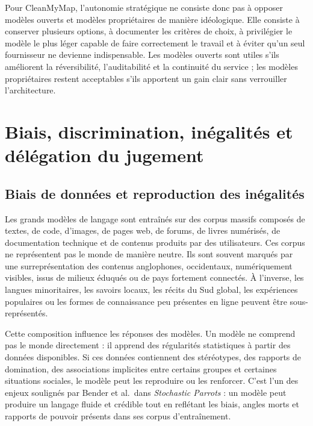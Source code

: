 \documentclass[
  10pt,
  a4paper,
  DIV=11,
  numbers=noendperiod,
  oneside]{scrreprt}
\let\oldemph\emph
\renewcommand{\emph}[1]{\oldemph{\textcolor{cmmgray}{#1}}}
\begin{document}
Pour CleanMyMap, l'autonomie stratégique ne consiste donc pas à opposer
modèles ouverts et modèles propriétaires de manière idéologique. Elle
consiste à conserver plusieurs options, à documenter les critères de
choix, à privilégier le modèle le plus léger capable de faire
correctement le travail et à éviter qu'un seul fournisseur ne devienne
indispensable. Les modèles ouverts sont utiles s'ils améliorent la
réversibilité, l'auditabilité et la continuité du service ; les modèles
propriétaires restent acceptables s'ils apportent un gain clair sans
verrouiller l'architecture.

\section{Biais, discrimination, inégalités et délégation du
jugement}\label{biais-discrimination-inuxe9galituxe9s-et-duxe9luxe9gation-du-jugement}

\subsection{Biais de données et reproduction des
inégalités}\label{biais-de-donnuxe9es-et-reproduction-des-inuxe9galituxe9s}

Les grands modèles de langage sont entraînés sur des corpus massifs
composés de textes, de code, d'images, de pages web, de forums, de
livres numérisés, de documentation technique et de contenus produits par
des utilisateurs. Ces corpus ne représentent pas le monde de manière
neutre. Ils sont souvent marqués par une surreprésentation des contenus
anglophones, occidentaux, numériquement visibles, issus de milieux
éduqués ou de pays fortement connectés. À l'inverse, les langues
minoritaires, les savoirs locaux, les récits du Sud global, les
expériences populaires ou les formes de connaissance peu présentes en
ligne peuvent être sous-représentés.

Cette composition influence les réponses des modèles. Un modèle ne
comprend pas le monde directement : il apprend des régularités
statistiques à partir des données disponibles. Si ces données
contiennent des stéréotypes, des rapports de domination, des
associations implicites entre certains groupes et certaines situations
sociales, le modèle peut les reproduire ou les renforcer. C'est l'un des
enjeux soulignés par Bender et al.~dans \emph{Stochastic Parrots} : un
modèle peut produire un langage fluide et crédible tout en reflétant les
biais, angles morts et rapports de pouvoir présents dans ses corpus
d'entraînement.
\end{document}
